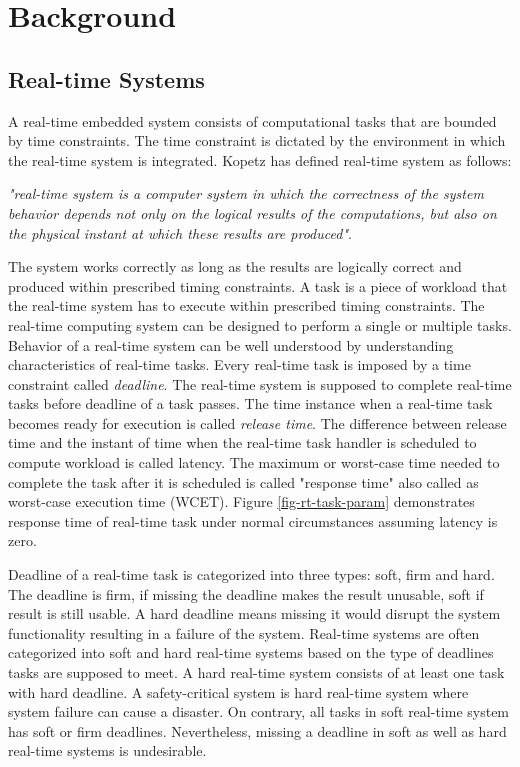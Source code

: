 \chapter{Background\label{chap2}}

\section{Real-time Systems}
A real-time embedded system consists of computational tasks that are bounded by time constraints. The time constraint is dictated by the environment in which the real-time system is integrated. 
Kopetz \cite{Kopetz:2011:RSD:1995310} has defined real-time system as follows:

\emph{"real-time system is a computer system in which the correctness of the system behavior depends not only on the logical results of the computations, but also on the physical instant at which these results are produced"}. 


The system works correctly as long as the results are logically correct and produced within prescribed timing constraints. 
A task is a piece of workload that the real-time system has to execute within prescribed timing constraints. 
The real-time computing system can be designed to perform a single or multiple tasks. 
Behavior of a real-time system can be well understood by understanding characteristics of real-time tasks. 
Every real-time task is imposed by a time constraint called \emph{deadline}. 
The real-time system is supposed to complete real-time tasks before deadline of a task passes.
The time instance when a real-time task becomes ready for execution is called \emph{release time}. 
The difference between release time and the instant of time when the real-time task handler is scheduled to compute workload is called latency.
The maximum or worst-case time needed to complete the task after it is scheduled is called "response time" also called as worst-case execution time (WCET). 
Figure \ref{fig-rt-task-param} demonstrates response time of real-time task under normal circumstances assuming latency is zero. 



Deadline of a real-time task is categorized into three types: soft, firm and hard. 
The deadline is firm, if missing the deadline makes the result unusable, soft if result is still usable. 
A hard deadline means missing it would disrupt the system functionality resulting in a failure of the system.
Real-time systems are often categorized into soft and hard real-time systems based on the type of deadlines tasks are supposed to meet.
A hard real-time system consists of at least one task with hard deadline. 
A safety-critical system is hard real-time system where system failure can cause a disaster.
On contrary, all tasks in soft real-time system has soft or firm deadlines. 
Nevertheless, missing a deadline in soft as well as hard real-time systems is undesirable.

